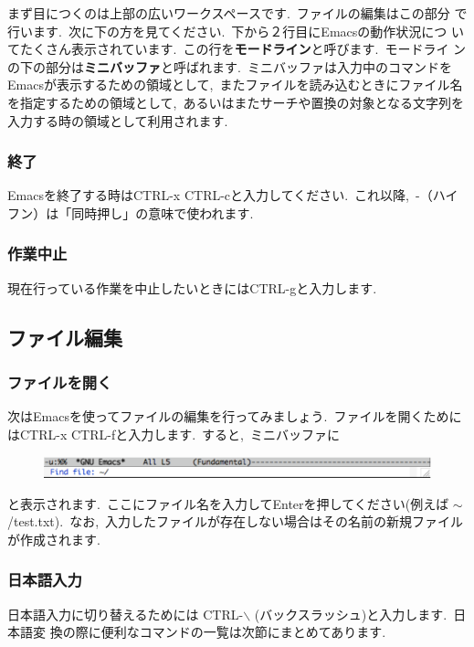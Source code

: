 \documentclass{jarticle}
\begin{document}
まず目につくのは上部の広いワークスペースです.\ ファイルの編集はこの部分
で行います.\ 次に下の方を見てください.\ 下から２行目にEmacsの動作状況につ
いてたくさん表示されています.\ この行を{\bf モードライン}と呼びます.\ モードライ
ンの下の部分は{\bf ミニバッファ}と呼ばれます.\ ミニバッファは入力中のコマンドを
Emacsが表示するための領域として,\ またファイルを読み込むときにファイル名
を指定するための領域として,\ あるいはまたサーチや置換の対象となる文字列を
入力する時の領域として利用されます.\ 

\subsubsection{終了}
Emacsを終了する時はCTRL-x CTRL-cと入力してください.\ これ以降,\ -（ハイフン）は「同時押し」の意味で使われます.\ 

\subsubsection{作業中止}
現在行っている作業を中止したいときにはCTRL-gと入力します.\ 

\subsection{ファイル編集}
\subsubsection{ファイルを開く}
次はEmacsを使ってファイルの編集を行ってみましょう.\ ファイルを開くために
はCTRL-x CTRL-fと入力します.\ すると,\ ミニバッファに

\begin{figure}[ht]
  \begin{center}
     \includegraphics[width=130mm,pagebox=cropbox,clip]{fig/emacs002.pdf}
  \end{center}
\end{figure}

\noindent
と表示されます.\ ここにファイル名を入力してEnterを押してください(例えば $\sim$/test.txt).\ なお,\ 
入力したファイルが存在しない場合はその名前の新規ファイルが作成されます.\ 

\subsubsection{日本語入力}
日本語入力に切り替えるためには CTRL-$\backslash$ (バックスラッシュ)と入力します.\ 日本語変
換の際に便利なコマンドの一覧は次節にまとめてあります.\ 
\end{document}
